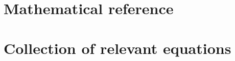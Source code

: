 \documentclass[a4paper, 12pt]{book}
\begin{document}
\clearpage

\begin{appendices}
\pagestyle{append}

\chapter{Mathematical reference}


\chapter{Collection of relevant equations}


\clearpage
\end{appendices}

\pagestyle{biblio}
\printbibliography[heading = bibintoc, title = {Bibliography}]
\end{document}
